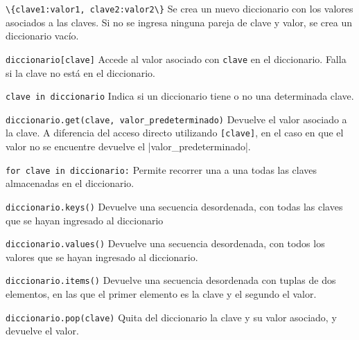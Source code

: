 \begin{referencia_python}

\begin{sintaxis}{\lstinline!\{clave1:valor1, clave2:valor2\}!}
Se crea un nuevo diccionario con los valores asociados a las claves.  Si no
se ingresa ninguna pareja de clave y valor, se crea un diccionario vacío.
\end{sintaxis}

\begin{sintaxis}{\lstinline{diccionario[clave]}}
Accede al valor asociado con \lstinline!clave! en el diccionario. Falla si la
clave no está en el diccionario.
\end{sintaxis}

\begin{sintaxis}{\lstinline{clave in diccionario}}
Indica si un diccionario tiene o no una determinada clave.
\end{sintaxis}

\begin{sintaxis}{\lstinline{diccionario.get(clave, valor_predeterminado)}}
Devuelve el valor asociado a la clave.  A diferencia del acceso directo
utilizando \lstinline{[clave]}, en el caso en que el valor no se
encuentre devuelve el |valor_predeterminado|.
\end{sintaxis}

\begin{sintaxis}{\lstinline{for clave in diccionario:}}
Permite recorrer una a una todas las claves almacenadas en
el diccionario.
\end{sintaxis}

\begin{sintaxis}{\lstinline{diccionario.keys()}}
Devuelve una secuencia desordenada, con todas las claves que se hayan ingresado
al diccionario
\end{sintaxis}

\begin{sintaxis}{\lstinline{diccionario.values()}}
Devuelve una secuencia desordenada, con todos los valores que se hayan
ingresado al diccionario.
\end{sintaxis}

\begin{sintaxis}{\lstinline{diccionario.items()}}
Devuelve una secuencia desordenada con tuplas de dos elementos, en las que el
primer elemento es la clave y el segundo el valor.
\end{sintaxis}

\begin{sintaxis}{\lstinline{diccionario.pop(clave)}}
Quita del diccionario la clave y su valor asociado, y devuelve el valor.
\end{sintaxis}
\end{referencia_python}


